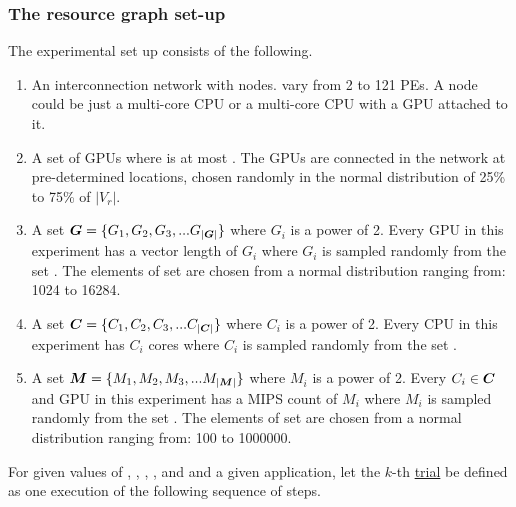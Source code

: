 \subsubsection{The resource graph set-up}
\label{sec:resource-graph-setup}

The experimental set up consists of the following.

\begin{enumerate}

\item An interconnection network with \numtplgynodes
  nodes. \numtplgynodes vary from 2 to 121 PEs. A node could be just a
  multi-core CPU or a multi-core CPU with a GPU attached to it.

\item A set of \gpunum GPUs where \gpunum is at most \numtplgynodes. The
  GPUs are connected in the network at pre-determined locations, chosen
  randomly in the normal distribution of 25\% to 75\% of $|V_r|$.

\item A set $\bm{G} = \{G_1, G_2, G_3, ... G_{|\bm{G}|}\}$ where
  $G_i$ is a power of 2.  Every GPU in this experiment has a vector
  length of $G_i$ where $G_i$ is sampled randomly from the set
  \veclenset. The elements of set \veclenset are chosen from a normal
  distribution ranging from: 1024 to 16284.

\item A set $\bm{C} = \{C_1, C_2, C_3, ... C_{|\bm{C}|}\}$
  where $C_i$ is a power of 2.  Every CPU in this experiment has $C_i$
  cores where $C_i$ is sampled randomly from the set \corenumset.

\item A set $\bm{M} = \{M_1, M_2, M_3, ... M_{|\bm{M}|}\}$ where
  $M_i$ is a power of 2.  Every $C_i \in \bm{C}$ and GPU in this
  experiment has a MIPS count of $M_i$ where $M_i$ is sampled randomly
  from the set \mipsset. The elements of set \mipsset are chosen from a
  normal distribution ranging from: 100 to 1000000.

\end{enumerate}

For given values of \numtplgynodes, \gpunum, \veclenset, \corenumset,
and \mipsset and a given application, let the $k$-th \ul{trial} be
defined as one execution of the following sequence of steps.

